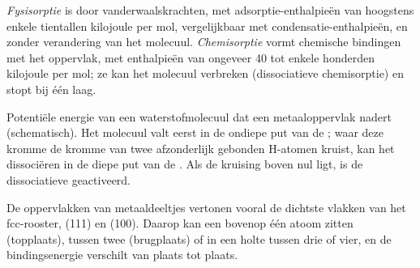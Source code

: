 \begin{definition}\label{def:b3:surfaces-catalysis:physi-chemi}
\emph{Fysisorptie} is  door vanderwaalskrachten,
met adsorptie-enthalpieën van hoogstens enkele tientallen kilojoule per
mol, vergelijkbaar met condensatie-enthalpieën, en zonder verandering van
het molecuul. \emph{Chemisorptie} vormt chemische
bindingen met het oppervlak, met enthalpieën van ongeveer 40 tot enkele
honderden kilojoule per mol; ze kan het molecuul verbreken (dissociatieve
chemisorptie) en stopt bij één laag.
\end{definition}

\begin{omfigure}

{\small Potentiële energie van een waterstofmolecuul dat een metaaloppervlak
nadert (schematisch). Het molecuul valt eerst in de ondiepe put van de
; waar deze kromme de kromme van twee afzonderlijk gebonden
H-atomen kruist, kan het dissociëren in de diepe put van de .
Als de kruising boven nul ligt, is de dissociatieve 
geactiveerd.}
\end{omfigure}

De oppervlakken van metaaldeeltjes vertonen vooral de dichtste vlakken van
het fcc-rooster, (111) en (100). Daarop kan een  bovenop één atoom
zitten (topplaats), tussen twee (brugplaats) of in een holte tussen drie
of vier, en de bindingsenergie verschilt van plaats tot plaats.

